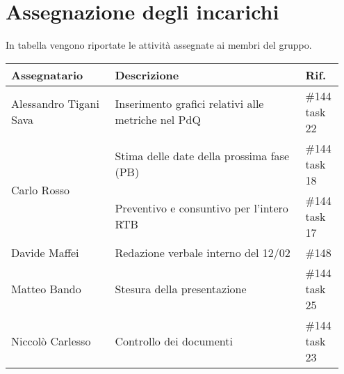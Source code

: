 \section{Assegnazione degli incarichi}
In tabella vengono riportate le attività assegnate ai membri del gruppo.
\begin{center}
	{
		\renewcommand{\arraystretch}{1.5}
		\begin{tabular}{p{0.30\linewidth}|p{0.55\linewidth}|p{0.10\linewidth}}
			\textbf{Assegnatario}             	& \textbf{Descrizione}								& \textbf{Rif.} \\

			\hline
			Alessandro Tigani Sava            & Inserimento grafici relativi alle metriche nel PdQ	& \#144 task 22	\\
			\hline
			\multirow{2}{*}{Carlo Rosso}    &  Stima delle date della prossima fase (PB)			& \#144 task 18	\\
			\cline{2-3}
			                                  & Preventivo e consuntivo per l'intero RTB 			& \#144 task 17    \\
			\hline
			Davide Maffei            			& Redazione verbale interno del 12/02				& \#148	\\
			\hline
			Matteo Bando            & Stesura della presentazione	& \#144 task 25	\\
			\hline
			 Niccolò Carlesso            & Controllo dei documenti	& \#144 task 23	\\
			\hline
		\end{tabular}
	}
\end{center}

